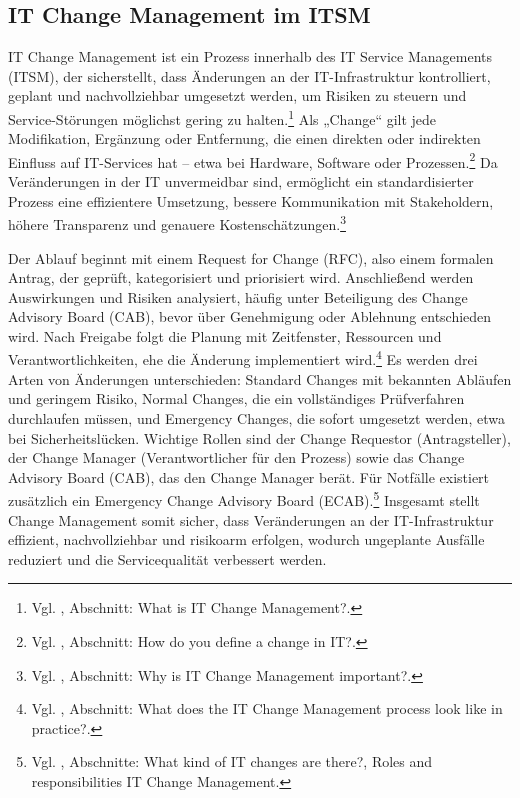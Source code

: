 \documentclass[
    12pt, 
    a4paper,
    ]{scrartcl} %
\begin{document}
\subsection{IT Change Management im ITSM}

IT Change Management ist ein Prozess innerhalb des IT Service Managements (ITSM), der sicherstellt, dass Änderungen an der IT-Infrastruktur kontrolliert, geplant und nachvollziehbar umgesetzt werden, um Risiken zu steuern und Service-Störungen möglichst gering zu halten.\footnote{Vgl. \cite{S_TOPdeskChangeManagement}, Abschnitt: What is IT Change Management?.} Als „Change“ gilt jede Modifikation, Ergänzung oder Entfernung, die einen direkten oder indirekten Einfluss auf IT-Services hat – etwa bei Hardware, Software oder Prozessen.\footnote{Vgl. \cite{S_TOPdeskChangeManagement}, Abschnitt: How do you define a change in IT?.} Da Veränderungen in der IT unvermeidbar sind, ermöglicht ein standardisierter Prozess eine effizientere Umsetzung, bessere Kommunikation mit Stakeholdern, höhere Transparenz und genauere Kostenschätzungen.\footnote{Vgl. \cite{S_TOPdeskChangeManagement}, Abschnitt: Why is IT Change Management important?.}

Der Ablauf beginnt mit einem Request for Change (RFC), also einem formalen Antrag, der geprüft, kategorisiert und priorisiert wird. Anschließend werden Auswirkungen und Risiken analysiert, häufig unter Beteiligung des Change Advisory Board (CAB), bevor über Genehmigung oder Ablehnung entschieden wird. Nach Freigabe folgt die Planung mit Zeitfenster, Ressourcen und Verantwortlichkeiten, ehe die Änderung implementiert wird.\footnote{Vgl. \cite{S_TOPdeskChangeManagement}, Abschnitt: What does the IT Change Management process look like in practice?.} 
Es werden drei Arten von Änderungen unterschieden: Standard Changes mit bekannten Abläufen und geringem Risiko, Normal Changes, die ein vollständiges Prüfverfahren durchlaufen müssen, und Emergency Changes, die sofort umgesetzt werden, etwa bei Sicherheitslücken. Wichtige Rollen sind der Change Requestor (Antragsteller), der Change Manager (Verantwortlicher für den Prozess) sowie das Change Advisory Board (CAB), das den Change Manager berät. Für Notfälle existiert zusätzlich ein Emergency Change Advisory Board (ECAB).\footnote{Vgl. \cite{S_TOPdeskChangeManagement}, Abschnitte: What kind of IT changes are there?, Roles and responsibilities IT Change Management.}
Insgesamt stellt Change Management somit sicher, dass Veränderungen an der IT-Infrastruktur effizient, nachvollziehbar und risikoarm erfolgen, wodurch ungeplante Ausfälle reduziert und die Servicequalität verbessert werden.
\end{document}
